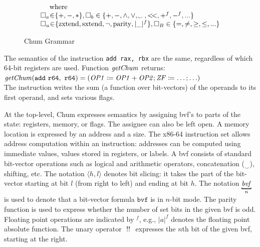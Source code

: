 \begin{figure}[thb]
\[\begin{array}{lcl}
\multicolumn{3}{l}{\mbox{\hspace{3ex}where}}\\
\multicolumn{3}{l}{\Box_a \hspace{-0.5ex}\in \hspace{-0.5ex}\{+,-,* \}, \Box_b \in \{+,-, \wedge, \vee, _\smile,<\!<, +^f, -^f,...\}}\\
\multicolumn{3}{l}{\Box_u \hspace{-0.5ex}\in \hspace{-0.5ex}\{\ucast, \sextend, \neg, \parity, |\_|^f \}, \Box_B \in \{ =, \neq, \geq, \leq,... \}}
\end{array}
\]
\caption{Chum Grammar}
\label{fig:grammar}
\end{figure}


\begin{example}
The semantics of the instruction \texttt{add rax, rbx} are the same, regardless of which 64-bit registers are used.
Function $\mathit{getChum}$ returns:
\\[1em]$
	 \mathit{getChum}(\mathtt{add~r64,~r64}) = (\mathit{OP1} \coloneqq \mathit{OP1} + \mathit{OP2} ; \mathit{ZF} \coloneqq \ldots ; \ldots)
$\\[1em]
The instruction writes the sum (a function over bit-vectors) of the operands to its first operand, and sets various flags.
\end{example}

At the top-level, Chum expresses semantics by assigning bvf's to parts of the state: registers, memory, or flags.
The assignee can also be left open.
A memory location is expressed by an address and a size.
The x86-64 instruction set allows address computation within an instruction: addresses can be computed using immediate values, values stored in registers, or labels.
A bvf consists of standard bit-vector operations such as logical and arithmetic operators, concatenation ($_\smile$), shifting, etc.
The notation $\langle h,l \rangle$ denotes bit slicing: it takes the part of the bit-vector starting at bit $l$ (from right to left) and ending at bit $h$.
The notation $\bitmoded{n}{\var{bvf}}$ is used to denote that a bit-vector formula $\mathtt{bvf}$ is in $n$-bit mode.
The parity function is used to express whether the number of set bits in the given bvf is odd.
Floating point operations are indicated by $^f$, e.g., $|a|^f$ denotes the floating point absolute function.
The unary operator $~!!~$ expresses the $n$th bit of the given bvf, starting at the right.

